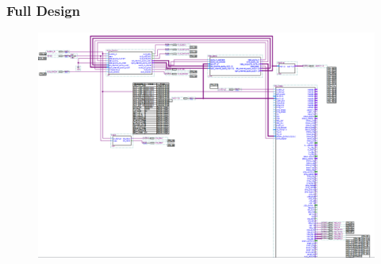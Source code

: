 \documentclass{beamer}
\begin{document}
\begin{frame}\frametitle{Full Design}
\begin{figure}[!htb]
  \centering
  \includegraphics[width=\textwidth]{top_level.PNG}
\end{figure}
\end{frame}
\end{document}
